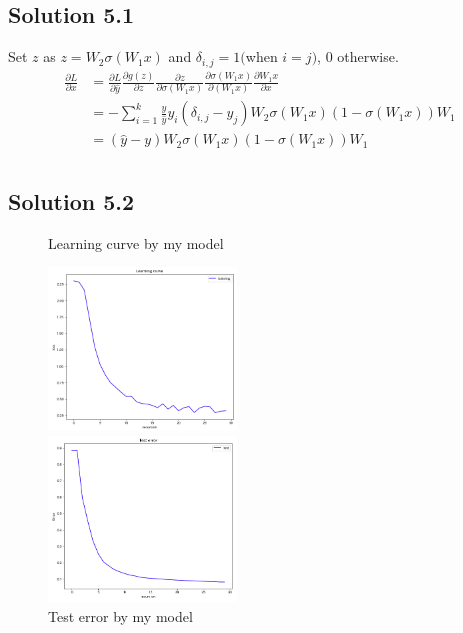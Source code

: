 \documentclass[a4paper]{article}
\theoremstyle{definition}
\newenvironment{soln}{
	\leavevmode\color{blue}\ignorespaces
}{}
\begin{document}
	\subsection*{Solution 5.1}	
	\begin{soln}
	Set $z$ as $z = W_2 \sigma(W_1 x)$ and $\delta_{i,j} = 1 ($when $i=j)$, $0$ otherwise.
		\begin{equation*}\label{xx}
			\begin{split}
\frac{\partial L}{\partial x} &= \frac{\partial L}{\partial \hat{y}} \frac{\partial g(z)}{\partial z} \frac{\partial z}{\partial \sigma(W_1 x)} \frac{\partial \sigma(W_1 x)}{\partial (W_1 x)} \frac{\partial W_1 x}{\partial x} \\
				&= - \sum^{k}_{i=1} \frac{y}{\hat{y}} y_i (\delta_{i,j} - y_j) W_2 \sigma(W_1 x ) (1- \sigma(W_1 x )) W_1 \\
				&= (\hat{y} - y) W_2 \sigma(W_1 x ) (1- \sigma(W_1 x )) W_1 \\
			\end{split}
		\end{equation*}	
	\end{soln}
	
	\clearpage
	
	\subsection*{Solution 5.2}	
	\begin{soln}
\begin{figure}[htbp]
\begin{minipage}{0.5\hsize}
\begin{center}
\caption{Learning curve by my model}
\includegraphics[width=50mm]{./img/my_learningcurve.png}
\end{center}
\captionsetup{labelformat=empty}
\end{minipage}
\begin{minipage}{0.5\hsize}
\begin{center}
\caption{Test error by my model}
\includegraphics[width=50mm]{./img/my_testerror.png}
\end{center}
\captionsetup{labelformat=empty}
\end{minipage}
\end{figure}
	\end{soln}
\end{document}
